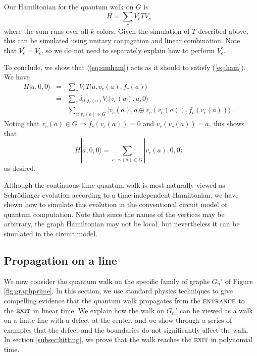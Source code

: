 \documentclass[aps,11pt,twoside,nofootinbib,tightenlines,superscriptaddress,preprintnumbers]{revtex4}
\newcommand{\<}{\langle}
\renewcommand{\>}{\rangle}
\newcommand{\be}{\begin{equation}}
\newcommand{\ee}{\end{equation}}
\newcommand{\bea}{\begin{eqnarray}}
\newcommand{\eea}{\end{eqnarray}}
\newcommand{\ent}{{\textsc{entrance}}}
\newcommand{\exit}{{\textsc{exit}}}
\begin{document}
Our Hamiltonian for the quantum walk on $G$ is
\be
  H = \sum_c V_c^\dag T V_c
\label{eq:simham}
\ee
where the sum runs over all $k$ colors.  Given the simulation of $T$
described above, this can be simulated using unitary conjugation and
linear combination.  Note that $V_c^\dag = V_c$, so we do not need to
separately explain how to perform $V_c^\dag$.

To conclude, we show that (\ref{eq:simham}) acts as it should to satisfy
(\ref{eq:ham}).  We have
\bea
  H |a, 0, 0\>
  &=& \sum_c V_c T |a, v_c(a), f_c(a)\> \\
  &=& \sum_c \delta_{0,f_c(a)} V_c |v_c(a), a, 0\> \\
  &=& \sum_{c:\, v_c(a) \in G} |v_c(a), a \oplus v_c(v_c(a)), f_c(v_c(a))\>
\,.
\eea
Noting that $v_c(a) \in G \Rightarrow f_c(v_c(a))=0$ and $v_c(v_c(a))=a$,
this shows that
\be
  H |a, 0, 0\> = \sum_{c:\, v_c(a) \in G} |v_c(a),0,0\>
\ee
as desired.

Although the continuous time quantum walk is most naturally viewed as
Schr\"odinger evolution according to a time-independent Hamiltonian, we
have shown how to simulate this evolution in the conventional circuit
model of quantum computation.  Note that since the names of the vertices
may be arbitrary, the graph Hamiltonian may not be local, but nevertheless
it can be simulated in the circuit model.

\subsection{Propagation on a line}\label{subsec:line}

We now consider the quantum walk on the specific family of graphs $G_n'$
of Figure \ref{fig:graphprime}.  In this section, we use standard physics
techniques to give compelling evidence that the quantum walk propagates
from the $\ent$ to the $\exit$ in linear time.  We explain how the walk on
$G_n'$ can be viewed as a walk on a finite line with a defect at the
center, and we show through a series of examples that the defect and the
boundaries do not significantly affect the walk.  In section
\ref{subsec:hitting}, we prove that the walk reaches the $\exit$ in
polynomial time.
\end{document}

